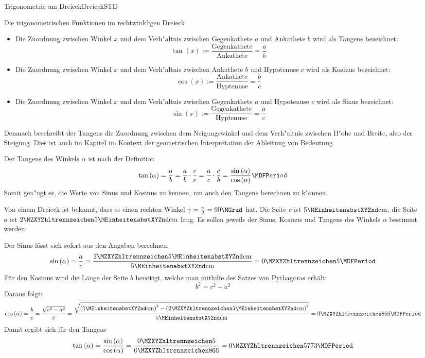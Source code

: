 \begin{MXContent}{Trigonometrie am Dreieck}{Dreieck}{STD}
\begin{MXInfo}{Die trigonometrischen Funktionen im rechtwinkligen Dreieck}
\begin{itemize}
\item
Die Zuordnung zwischen Winkel $x$ und dem Verh"altnis zwischen Gegenkathete $a$ 
und Ankathete $b$ wird als Tangens bezeichnet:
\[
\tan(x) := \frac{\text{Gegenkathete}}{\text{Ankathete}} = \frac{a}{b} %
\]
%
\item
Die Zuordnung zwischen Winkel $x$ und dem Verh"altnis zwischen Ankathete $b$ und 
Hypotenuse $c$ wird als Kosinus bezeichnet:
\[
\cos(x) := \frac{\text{Ankathete}}{\text{Hyptenuse}} = \frac{b}{c} %
\]
%
\item
Die Zuordnung zwischen Winkel $x$ und dem Verh"altnis zwischen Gegenkathete $a$ 
und Hypotenuse $c$ wird als Sinus bezeichnet:
\[
\sin(x) := \frac{\text{Gegenkathete}}{\text{Hyptenuse}} = \frac{a}{c} %
\]
\end{itemize}
\end{MXInfo}

Demnach beschreibt der Tangens die Zuordnung zwischen dem Neigungswinkel und 
dem Verh"altnis zwischen H"ohe und Breite, also der Steigung. Dies ist auch 
im Kapitel  im Kontext der geometrischen Interpretation der 
Ableitung von Bedeutung.

Der Tangens des Winkels $\alpha$ ist nach der Definition 
\[
\tan\left(\alpha\right)=\frac{a}{b}=\frac{a}{b}\cdot\frac{c}{c} %
 =\frac{a}{c}\cdot\frac{c}{b} %
 =\frac{\sin\left(\alpha\right)}{\cos\left(\alpha\right)} \MDFPeriod %
\]
Somit gen"ugt es, die Werte von Sinus und Kosinus zu kennen, um auch den 
Tangens berechnen zu k"onnen.

\begin{MExample}
Von einem Dreieck ist bekannt, dass es einen rechten Winkel 
$\gamma=\frac{\pi}{2}=90\MGrad$ hat. Die Seite $c$ ist $5\MEinheit{cm}$, 
die Seite $a$ ist $\MZahl{2}{5}\MEinheit{cm}$ lang. Es sollen jeweils der Sinus,
Kosinus und Tangens des Winkels $\alpha$ bestimmt werden:

Der Sinus l\"asst sich sofort aus den Angaben berechnen:
\[
\sin\left(\alpha\right)=\frac{a}{c}
 =\frac{\MZahl{2}{5}\MEinheit{cm}}{5\MEinheit{cm}}=\MZahl{0}{5} \MDFPeriod\]
F\"ur den Kosinus wird die L\"ange der Seite $b$ ben\"otigt, welche man 
mithilfe des Satzes von Pythagoras erh\"alt:
\[
b^2 = c^2 - a^2 %
\]
Daraus folgt:
\[
\cos\left(\alpha\right)=\frac{b}{c}=\frac{\sqrt{c^2-a^2}}{c} %
 =\frac{\sqrt{\left(5\MEinheit{cm}\right)^2 - \left(\MZahl{2}{5}\MEinheit{cm}\right)^2}}{5\MEinheit{cm}}=\MZahl{0}{866} \MDFPeriod %
\]
Damit ergibt sich f\"ur den Tangens
\[
\tan\left(\alpha\right) %
 =\frac{\sin\left(\alpha\right)}{\cos\left(\alpha\right)} %
 =\frac{\MZahl{0}{5}}{\MZahl{0}{866}}=\MZahl{0}{5773} \MDFPeriod
\]
\end{MExample}



\end{MXContent}
